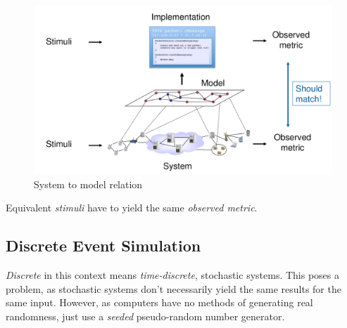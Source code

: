 \documentclass[english]{panikzettel}
\begin{document}
	\begin{figure}[H]
		\centering
		\includegraphics[width=\textwidth]{img/5-system-to-model.png}
		\caption{System to model relation}
		\label{img-5-system-to-model}
	\end{figure}
	
	Equivalent \textit{stimuli} have to yield the same \textit{observed metric}.

	\subsection{Discrete Event Simulation}
	\label{ss:discrete-event-simulation:discrete-event-simulation}
	
	\textit{Discrete} in this context means \textit{time-discrete}, stochastic systems.
	This poses a problem, as stochastic systems don't necessarily yield the same results for the same input. 
	However, as computers have no methods of generating real randomness, just use a  \textit{seeded} pseudo-random number generator.
\end{document}

